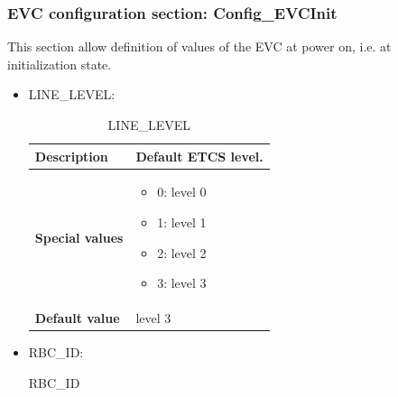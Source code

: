 \documentclass{template/openetcs}
\begin{document}
\subsubsection{EVC configuration section: Config\_EVCInit}
This section allow definition of values of the EVC at power on, i.e. at initialization state.
	\begin{itemize}
		\item LINE\_LEVEL:
		
			\begin{longtable}{|l|l|}
				\caption{LINE\_LEVEL}\\ 
				\hline
				
					\begin{minipage}[t]{0.22\linewidth} \textbf{Description}	\end{minipage} 
				&	\begin{minipage}[t]{0.78\linewidth} Default ETCS level. \end{minipage} \\
				
				\hline
																																									
					\begin{minipage}[t]{0.22\linewidth} \textbf{Special values}	\end{minipage} 
				&	\begin{minipage}[t]{0.78\linewidth} \begin{itemize} \item 0: level 0 \item 1: level 1 \item 2: level 2 \item 3: level 3 \end{itemize} \end{minipage} \\
				
				\hline
				
					\begin{minipage}[t]{0.22\linewidth} \textbf{Default value}	\end{minipage} 
				&	\begin{minipage}[t]{0.78\linewidth} level 3 \end{minipage} \\
				
				\hline
				
			\end{longtable}
			
		\item RBC\_ID:
				
			\begin{longtable}{|l|l|}
				\caption{RBC\_ID}\\ 
				\hline
				

\end{longtable}
\end{itemize}
\end{document}
